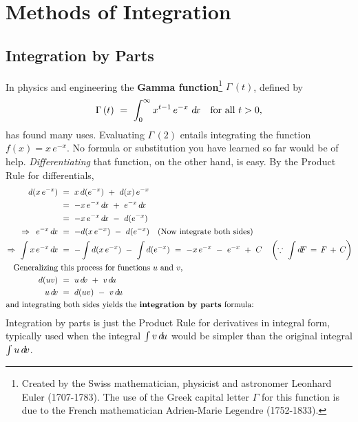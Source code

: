 \chapter{Methods of Integration}\label{ch:methods-of-integration}
\section{Integration by Parts}\label{sec:int-by-parts}
In physics and engineering the
\textbf{Gamma function}\footnote{Created by the Swiss
mathematician, physicist and astronomer Leonhard Euler (1707-1783). The use of
the Greek capital letter $\Gamma$ for this function is due to the French
mathematician Adrien-Marie Legendre (1752-1833).}
 $\Gamma\,(t)$, defined by
{
  \setlength{\abovedisplayskip}{0.3em}
  \setlength{\belowdisplayskip}{0.3em}
\[
\Gamma\,(t) ~=~ \int_0^{\infty} x^{t-1} \, e^{-x} ~d\!x \quad\text{for all $t > 0$,}
\]
}
has found many uses. Evaluating $\Gamma\,(2)$ entails integrating the function
$f(x) = x\,e^{-x}$. No formula or substitution you have learned so far would be
of help. \emph{Differentiating} that function, on the other hand, is easy. By
the Product Rule for differentials,
{
  \setlength{\abovedisplayskip}{0.5em}
  \setlength{\belowdisplayskip}{0.5em}
\begin{align*}
d(x\,e^{-x}) ~&=~ x\,d(e^{-x}) ~+~ d(x)\,e^{-x}\\
&=~ -x\,e^{-x}\,\dx ~+~ e^{-x}\,\dx\\
&=~ -x\,e^{-x}\,\dx ~-~ d(e^{-x})\\
\Rightarrow~\,e^{-x}\,\dx ~&=~ -d(x\,e^{-x}) ~-~ d(e^{-x}) \quad(\text{Now integrate both sides})\\
\Rightarrow~\int x\,e^{-x}\,\dx ~&=~ -\int d(x\,e^{-x}) ~-~ \int d(e^{-x})
~=~ -x\,e^{-x} ~-~ e^{-x} ~+~ C \quad\left(\because~\int d\!F \,=\, F \,+\, C\right)\\
\text{Generalizing}~&\text{this process for functions $u$ and $v$,}\\
d(uv) ~&=~ u\,\dv ~+~ v\,\du\\
u\,\dv ~&=~ d(uv) ~-~ v\,\du\\
\text{and integrating}&~\text{both sides yields the
  \textbf{integration by parts} formula:\index{integration!by parts}}
\end{align*}
}
\vspace{-2em}
\vspace{-0.7em}
Integration by parts is just the Product Rule for derivatives in integral form,
typically used when the integral $\int v\,d\!u$ would be simpler than the
original integral $\int u\,d\!v$.

